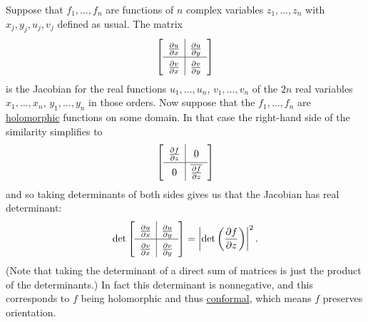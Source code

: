 \documentclass[12pt]{article}
\theoremstyle{definition}
\theoremstyle{remark}
\begin{document}
Suppose that $f_1 , \dotsc , f_n$ are functions of $n$ complex variables $z_1 , \dotsc , z_n$ with $x_j, y_j, u_j, v_j$ defined as usual. The matrix
\begin{equation}
    \left[
        \def\arraystretch{1.5}
        \begin{array}{c | c}
            \frac{\partial u}{\partial x} & \frac{\partial u}{\partial y} \\
            \hline 
            \frac{\partial v}{\partial x} & \frac{\partial v}{\partial y}
        \end{array}
    \right]
\end{equation}
is the Jacobian for the real functions $u_1 , \dotsc , u_n$, $v_1 , \dotsc , v_n$ of the $2n$ real variables $x_1 , \dotsc , x_n$, $y_1 , \dotsc , y_n$ in those orders. Now suppose that the $f_1 , \dotsc , f_n$ are \underline{holomorphic} functions on some domain. In that case the right-hand side of the similarity simplifies to 
\begin{equation}
    \left[
        \def\arraystretch{1.5}
        \begin{array}{c | c}
            \frac{\partial f}{\partial z} & 0 \\
            \hline 
            0 & \overline{\frac{\partial f}{\partial z}}
        \end{array}
    \right]
\end{equation}
and so taking determinants of both sides gives us that the Jacobian has real determinant:
\begin{equation}
    \det 
    \left[
        \def\arraystretch{1.5}
        \begin{array}{c | c}
            \frac{\partial u}{\partial x} & \frac{\partial u}{\partial y} \\
            \hline 
            \frac{\partial v}{\partial x} & \frac{\partial v}{\partial y}
        \end{array}
    \right]
    = 
    \left| \det \left( \frac{\partial f}{\partial z} \right) \right|^2.
\end{equation}
(Note that taking the determinant of a direct sum of matrices is just the product of the determinants.) In fact this determinant is nonnegative, and this corresponds to $f$ being holomorphic and thus \underline{conformal}, which means $f$ preserves orientation.
\end{document}
